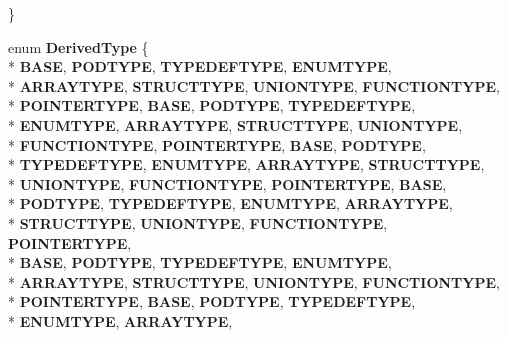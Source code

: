 \begin{DoxyCompactItemize}
 \}
\item 
enum {\bfseries Derived\-Type} \{ \\*
{\bfseries B\-A\-S\-E}, 
{\bfseries P\-O\-D\-T\-Y\-P\-E}, 
{\bfseries T\-Y\-P\-E\-D\-E\-F\-T\-Y\-P\-E}, 
{\bfseries E\-N\-U\-M\-T\-Y\-P\-E}, 
\\*
{\bfseries A\-R\-R\-A\-Y\-T\-Y\-P\-E}, 
{\bfseries S\-T\-R\-U\-C\-T\-T\-Y\-P\-E}, 
{\bfseries U\-N\-I\-O\-N\-T\-Y\-P\-E}, 
{\bfseries F\-U\-N\-C\-T\-I\-O\-N\-T\-Y\-P\-E}, 
\\*
{\bfseries P\-O\-I\-N\-T\-E\-R\-T\-Y\-P\-E}, 
{\bfseries B\-A\-S\-E}, 
{\bfseries P\-O\-D\-T\-Y\-P\-E}, 
{\bfseries T\-Y\-P\-E\-D\-E\-F\-T\-Y\-P\-E}, 
\\*
{\bfseries E\-N\-U\-M\-T\-Y\-P\-E}, 
{\bfseries A\-R\-R\-A\-Y\-T\-Y\-P\-E}, 
{\bfseries S\-T\-R\-U\-C\-T\-T\-Y\-P\-E}, 
{\bfseries U\-N\-I\-O\-N\-T\-Y\-P\-E}, 
\\*
{\bfseries F\-U\-N\-C\-T\-I\-O\-N\-T\-Y\-P\-E}, 
{\bfseries P\-O\-I\-N\-T\-E\-R\-T\-Y\-P\-E}, 
{\bfseries B\-A\-S\-E}, 
{\bfseries P\-O\-D\-T\-Y\-P\-E}, 
\\*
{\bfseries T\-Y\-P\-E\-D\-E\-F\-T\-Y\-P\-E}, 
{\bfseries E\-N\-U\-M\-T\-Y\-P\-E}, 
{\bfseries A\-R\-R\-A\-Y\-T\-Y\-P\-E}, 
{\bfseries S\-T\-R\-U\-C\-T\-T\-Y\-P\-E}, 
\\*
{\bfseries U\-N\-I\-O\-N\-T\-Y\-P\-E}, 
{\bfseries F\-U\-N\-C\-T\-I\-O\-N\-T\-Y\-P\-E}, 
{\bfseries P\-O\-I\-N\-T\-E\-R\-T\-Y\-P\-E}, 
{\bfseries B\-A\-S\-E}, 
\\*
{\bfseries P\-O\-D\-T\-Y\-P\-E}, 
{\bfseries T\-Y\-P\-E\-D\-E\-F\-T\-Y\-P\-E}, 
{\bfseries E\-N\-U\-M\-T\-Y\-P\-E}, 
{\bfseries A\-R\-R\-A\-Y\-T\-Y\-P\-E}, 
\\*
{\bfseries S\-T\-R\-U\-C\-T\-T\-Y\-P\-E}, 
{\bfseries U\-N\-I\-O\-N\-T\-Y\-P\-E}, 
{\bfseries F\-U\-N\-C\-T\-I\-O\-N\-T\-Y\-P\-E}, 
{\bfseries P\-O\-I\-N\-T\-E\-R\-T\-Y\-P\-E}, 
\\*
{\bfseries B\-A\-S\-E}, 
{\bfseries P\-O\-D\-T\-Y\-P\-E}, 
{\bfseries T\-Y\-P\-E\-D\-E\-F\-T\-Y\-P\-E}, 
{\bfseries E\-N\-U\-M\-T\-Y\-P\-E}, 
\\*
{\bfseries A\-R\-R\-A\-Y\-T\-Y\-P\-E}, 
{\bfseries S\-T\-R\-U\-C\-T\-T\-Y\-P\-E}, 
{\bfseries U\-N\-I\-O\-N\-T\-Y\-P\-E}, 
{\bfseries F\-U\-N\-C\-T\-I\-O\-N\-T\-Y\-P\-E}, 
\\*
{\bfseries P\-O\-I\-N\-T\-E\-R\-T\-Y\-P\-E}, 
{\bfseries B\-A\-S\-E}, 
{\bfseries P\-O\-D\-T\-Y\-P\-E}, 
{\bfseries T\-Y\-P\-E\-D\-E\-F\-T\-Y\-P\-E}, 
\\*
{\bfseries E\-N\-U\-M\-T\-Y\-P\-E}, 
{\bfseries A\-R\-R\-A\-Y\-T\-Y\-P\-E}, 

\end{DoxyCompactItemize}
